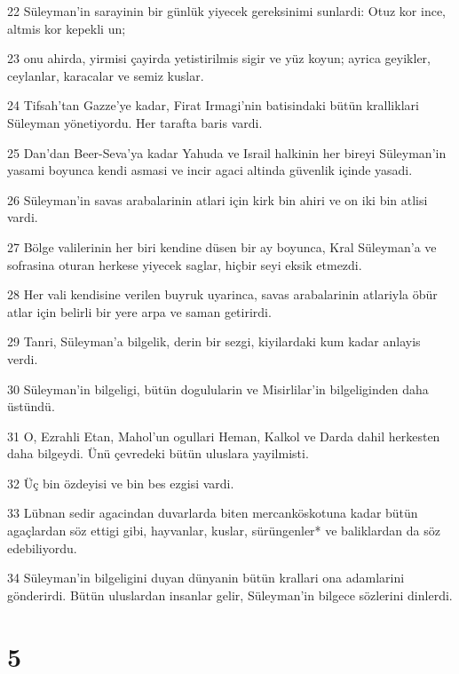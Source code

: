 \par 22 Süleyman'in sarayinin bir günlük yiyecek gereksinimi sunlardi: Otuz kor ince, altmis kor kepekli un;
\par 23 onu ahirda, yirmisi çayirda yetistirilmis sigir ve yüz koyun; ayrica geyikler, ceylanlar, karacalar ve semiz kuslar.
\par 24 Tifsah'tan Gazze'ye kadar, Firat Irmagi'nin batisindaki bütün kralliklari Süleyman yönetiyordu. Her tarafta baris vardi.
\par 25 Dan'dan Beer-Seva'ya kadar Yahuda ve Israil halkinin her bireyi Süleyman'in yasami boyunca kendi asmasi ve incir agaci altinda güvenlik içinde yasadi.
\par 26 Süleyman'in savas arabalarinin atlari için kirk bin ahiri ve on iki bin atlisi vardi.
\par 27 Bölge valilerinin her biri kendine düsen bir ay boyunca, Kral Süleyman'a ve sofrasina oturan herkese yiyecek saglar, hiçbir seyi eksik etmezdi.
\par 28 Her vali kendisine verilen buyruk uyarinca, savas arabalarinin atlariyla öbür atlar için belirli bir yere arpa ve saman getirirdi.
\par 29 Tanri, Süleyman'a bilgelik, derin bir sezgi, kiyilardaki kum kadar anlayis verdi.
\par 30 Süleyman'in bilgeligi, bütün dogulularin ve Misirlilar'in bilgeliginden daha üstündü.
\par 31 O, Ezrahli Etan, Mahol'un ogullari Heman, Kalkol ve Darda dahil herkesten daha bilgeydi. Ünü çevredeki bütün uluslara yayilmisti.
\par 32 Üç bin özdeyisi ve bin bes ezgisi vardi.
\par 33 Lübnan sedir agacindan duvarlarda biten mercanköskotuna kadar bütün agaçlardan söz ettigi gibi, hayvanlar, kuslar, sürüngenler* ve baliklardan da söz edebiliyordu.
\par 34 Süleyman'in bilgeligini duyan dünyanin bütün krallari ona adamlarini gönderirdi. Bütün uluslardan insanlar gelir, Süleyman'in bilgece sözlerini dinlerdi.

\chapter{5}

